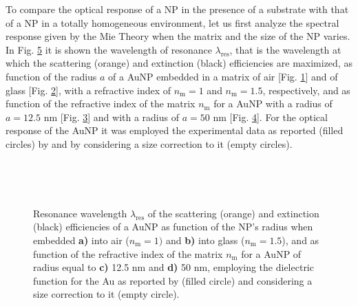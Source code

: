 
To compare the optical response of a NP in the presence of a substrate with that of a NP in a totally homogeneous environment, let us first analyze the spectral response given by the Mie Theory when the matrix and the size of the NP varies. In Fig. \ref{fig:Mie:redshift} it is shown the wavelength
 of resonance $\lambda_\text{res}$, that is the wavelength at which the scattering (orange) and extinction (black) efficiencies are maximized,  as function of the radius $a$ of a AuNP embedded in a matrix of air [Fig. \ref{sfig:red:1}] and of glass [Fig. \ref{sfig:red:2}], with a refractive index of $n_\text{m} = 1$ and $n_\text{m} = 1.5$, respectively, and as function of the refractive index of the matrix $n_\text{m}$ for a AuNP with a radius of {$a = 12.5$ nm} [Fig. \ref{sfig:red:3}] and with a radius of $a = 50$ nm [Fig. \ref{sfig:red:4}]. For the optical response of the AuNP it was employed the experimental data as reported (filled circles) by \citeauthor{johnson_optical_1972} \cite{johnson_optical_1972}  and by considering a size correction to it (empty circles).

\begin{figure}[h!]
    \def\svgwidth{\textwidth}
    \vspace*{-22em} \\
    \hspace*{-3.2em}%
        \begin{subfigure}{.24\textwidth}\caption{ }\label{sfig:red:1}\end{subfigure}%
        \begin{subfigure}{.24\textwidth}\caption{ }\label{sfig:red:2}\end{subfigure}%
        \begin{subfigure}{.25\textwidth}\caption{ }\label{sfig:red:3}\end{subfigure}%
        \begin{subfigure}{.24\textwidth}\caption{ }\label{sfig:red:4}\end{subfigure}
    \vspace*{17.5em}\\
    \caption[Spectral redshift of the scattering and extinction  efficiencies of a spherical AuNP as function of its size and the embedding media]{Resonance wavelength $\lambda_\text{res}$ of the scattering (orange) and extinction (black) efficiencies of a AuNP as function of the NP's radius when embedded \textbf{a)} into air ($n_\text{m} = 1)$ and \textbf{b)} into glass ($n_\text{m} = 1.5$), and as function of the refractive index of the matrix  $n_\text{m}$ for a AuNP of radius equal to  \textbf{c)} 12.5 nm and \textbf{d)} 50 nm, employing the dielectric function for the Au as reported by \citeauthor{johnson_optical_1972} (filled circle) and considering a size correction to it (empty circle).}
    \label{fig:Mie:redshift}
\end{figure}


